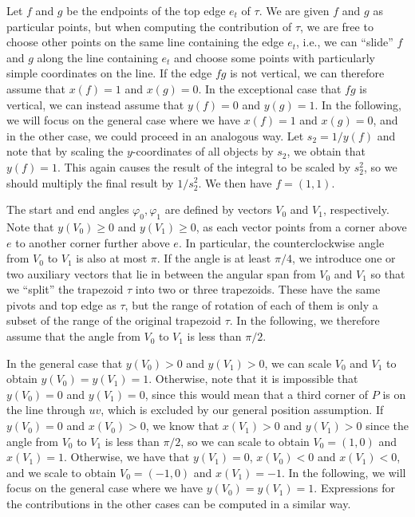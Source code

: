 \documentclass{article}
\begin{document}
Let $f$ and $g$ be the endpoints of the top edge $e_t$ of $\tau$.
We are given $f$ and $g$ as particular points, but when computing the contribution of $\tau$, we are free to choose other points on the same line containing the edge $e_t$, i.e., we can ``slide'' $f$ and $g$ along the line containing $e_t$ and choose some points with particularly simple coordinates on the line.
If the edge $fg$ is not vertical, we can therefore assume that $x(f)=1$ and $x(g)=0$.
In the exceptional case that $fg$ is vertical, we can instead assume that $y(f)=0$ and $y(g)=1$.
In the following, we will focus on the general case where we have $x(f)=1$ and $x(g)=0$, and in the other case, we could proceed in an analogous way.
Let $s_2=1/y(f)$ and note that by scaling the $y$-coordinates of all objects by $s_2$, we obtain that $y(f)=1$.
This again causes the result of the integral to be scaled by $s_2^2$, so we should multiply the final result by $1/s_2^2$.
We then have $f=(1,1)$.

The start and end angles $\varphi_0,\varphi_1$ are defined by vectors $V_0$ and $V_1$, respectively.
Note that $y(V_0)\geq 0$ and $y(V_1)\geq 0$, as each vector points from a corner above $e$ to another corner further above $e$.
In particular, the counterclockwise angle from $V_0$ to $V_1$ is also at most $\pi$.
If the angle is at least $\pi/4$, we introduce one or two auxiliary vectors that lie in between the angular span from $V_0$ and $V_1$ so that we ``split'' the trapezoid $\tau$ into two or three trapezoids.
These have the same pivots and top edge as $\tau$, but the range of rotation of each of them is only a subset of the range of the original trapezoid $\tau$.
In the following, we therefore assume that the angle from $V_0$ to $V_1$ is less than $\pi/2$.

In the general case that $y(V_0)> 0$ and $y(V_1)> 0$, we can scale $V_0$ and $V_1$ to obtain $y(V_0)=y(V_1)=1$.
Otherwise, note that it is impossible that $y(V_0)=0$ and $y(V_1)=0$, since this would mean that a third corner of $P$ is on the line through $uv$, which is excluded by our general position assumption.
If $y(V_0)=0$ and $x(V_0)>0$, we know that $x(V_1)>0$ and $y(V_1)>0$ since the angle from $V_0$ to $V_1$ is less than $\pi/2$, so we can scale to obtain $V_0=(1,0)$ and $x(V_1)=1$.
Otherwise, we have that $y(V_1)=0$, $x(V_0)<0$ and $x(V_1)<0$, and we scale to obtain $V_0=(-1,0)$ and $x(V_1)=-1$.
In the following, we will focus on the general case where we have $y(V_0)=y(V_1)=1$.
Expressions for the contributions in the other cases can be computed in a similar way.
\end{document}
